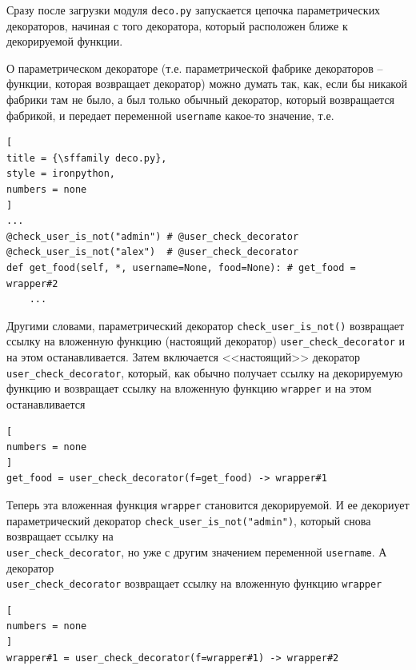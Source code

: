 \documentclass[%
	11pt,
	a4paper,
	utf8,
		]{article}
\begin{document}
Сразу после загрузки модуля \texttt{deco.py} запускается цепочка параметрических декораторов, начиная с того декоратора, который расположен ближе к декорируемой функции. 

О параметрическом декораторе (т.е. параметрической фабрике декораторов -- функции, которая возвращает декоратор) можно думать так, как, если бы никакой фабрики там не было, а был только обычный декоратор, который возвращается фабрикой, и передает переменной \texttt{username} какое-то значение, т.е.
\begin{lstlisting}[
title = {\sffamily deco.py},
style = ironpython,
numbers = none	
]
...
@check_user_is_not("admin") # @user_check_decorator
@check_user_is_not("alex")  # @user_check_decorator
def get_food(self, *, username=None, food=None): # get_food = wrapper#2
    ...
\end{lstlisting}

Другими словами, параметрический декоратор \texttt{check\_user\_is\_not()} возвращает ссылку на вложенную функцию (настоящий декоратор) \texttt{user\_check\_decorator} и на этом останавливается. Затем включается <<настоящий>> декоратор \texttt{user\_check\_decorator}, который, как обычно получает ссылку на декорируемую функцию и возвращает ссылку на вложенную функцию \texttt{wrapper} и на этом останавливается
\begin{lstlisting}[
numbers = none	
]
get_food = user_check_decorator(f=get_food) -> wrapper#1
\end{lstlisting}

Теперь эта вложенная функция \texttt{wrapper} становится декорируемой. И ее декориует параметрический декоратор \texttt{check\_user\_is\_not("admin")}, который снова возвращает ссылку на \\ \texttt{user\_check\_decorator}, но уже с другим значением переменной \texttt{username}. А декоратор \\ \texttt{user\_check\_decorator} возвращает ссылку на вложенную функцию \texttt{wrapper}
\begin{lstlisting}[
numbers = none	
]
wrapper#1 = user_check_decorator(f=wrapper#1) -> wrapper#2
\end{lstlisting}
\end{document}
